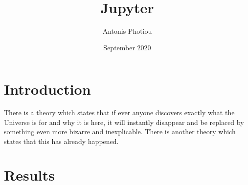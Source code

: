 \documentclass{article}
\title{Jupyter}
\author{Antonis Photiou}
\date{September 2020}
\begin{document}
\maketitle

\section{Introduction}
There is a theory which states that if ever anyone discovers exactly what the Universe is for and why it is here, it will instantly disappear and be replaced by something even more bizarre and inexplicable.
There is another theory which states that this has already happened.

\section{Results}



\end{document}

